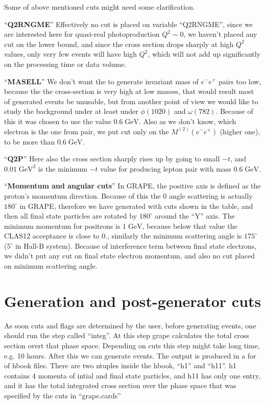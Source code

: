 \documentclass[letterpaper,12pt]{article}
\begin{document}
 Some of above mentioned cuts might need some clarification.
 
 ``\textbf{Q2RNGME}'' Effectively no cut is placed on variable ``Q2RNGME'', since we are interested here for quasi-real photoproduction $Q^{2} \sim 0$, we haven't placed any cut on the lower bound,
 and since the cross section drops sharply at high $Q^{2}$ values, only very few events will have high $Q^{2}$, which will not add up significantly on the processing time or data volume. 
 
 ``\textbf{MASELL}'' We don't want the to generate invariant mass of $e^{-}e^{+}$ pairs too low, because the the cross-section is very high at low masses, that would
 result most of generated events be unusable, but from another point of view we would like to study the background under at least under $\phi(1020)$ and $\omega(782)$. Because
 of this it was chosen to use the value $0.6\; \mathrm{GeV}$. Also as we don't know, which electron is the one from pair, we put cut only on the $M^{(2)}(e^{-}e^{+})$ (higher one),
 to be more than  $0.6\; \mathrm{GeV}$.
 
 ``\textbf{Q2P}'' Here also the cross section sharply rises up by going to small $-t$, and $0.01\;\mathrm{GeV^{2}}$ is the minimum $-t$ value for producing lepton pair with mass $0.6\; \mathrm{GeV}$.
 
 ``\textbf{Momentum and angular cuts}'' In GRAPE, the positive axis is defined as the proton's momentum direction. Because of this the $0$ angle scattering is actually $180^{\circ}$
 in GRAPE, therefore we have generated with cuts shown in the table, and then all final state particles are rotated by $180^{\circ}$ around the ``Y'' axis.
 The minimum momentum for positrons is $1\; \mathrm{GeV}$, because below that value the CLAS12 acceptance is close to 0., similarly the minimum scattering angle is $175^{\circ}$ ($5^{\circ}$ in Hall-B system).
 Because of interference term between final state electrons, we didn't put any cut on final state electron momentum, and also no cut placed on minimum scattering angle.
 
 \section{Generation and post-generator cuts}
 
 As soon cuts and flags are determined by the user, before generating events, one should run the step called ``integ''. At this step grape calculates the total cross section overt that phase space.
 Depending on cuts this step might take long time, e.g. 10 hours. After this we can generate events.
 The output is produced in a for of hbook files. There are two ntuples inside the hbook, ``h1'' and ``h11''. h1 contains 4 momenta of intial and final state particles, and
 h11 has only one entry, and it has the total integrated cross section over the phase space that was specified by the cuts in ``grape.cards''
 
\end{document}
